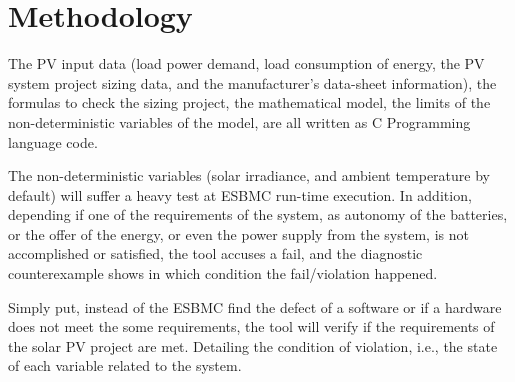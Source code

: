 \documentclass[journal]{IEEEtran}
\begin{document}
\section{Methodology }
%
%
%
%
The PV input data (load power demand, load consumption of energy, the PV system project sizing data, and the manufacturer's data-sheet information), the formulas to check the sizing project, the mathematical model, the limits of the non-deterministic variables of the model, are all written as C Programming language code. 

The non-deterministic variables (solar irradiance, and ambient temperature by default) will suffer a heavy test at ESBMC run-time execution. In addition, depending if one of the requirements of the system, as autonomy of the batteries, or the offer of the energy, or even the power supply from the system, is not accomplished or satisfied, the tool accuses a fail, and the diagnostic counterexample shows in which condition the fail/violation happened. 

Simply put, instead of the ESBMC find the defect of a software or if a hardware does not meet the some requirements, the tool will verify if the requirements of the solar PV project are met. Detailing the condition of violation, i.e., the state of each variable related to the system. 
\end{document}
